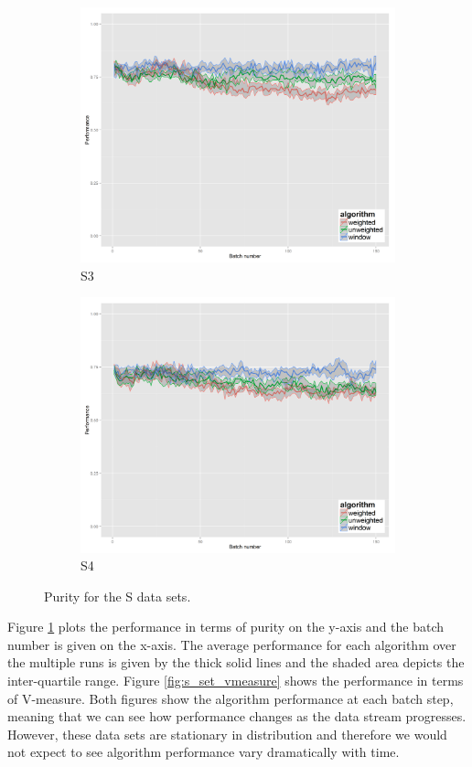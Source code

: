 \begin{figure}[H]
\begin{subfigure}{.45\textwidth}
  \includegraphics[width=.9\linewidth]{s_set/s_set_3_ci_one_size_purity.png}
  \caption{S3}
\end{subfigure}%
\begin{subfigure}{.45\textwidth}
  \centering
  \includegraphics[width=.9\linewidth]{s_set/s_set_4_ci_one_size_purity.png}
  \caption{S4}
\end{subfigure}
\caption{Purity for the S data sets.}
\label{fig:s_set_purity}
\end{figure}

Figure \ref{fig:s_set_purity} plots the performance in terms of purity on the y-axis and the batch number is given on the x-axis. The average performance for each algorithm over the multiple runs is given by the thick solid lines and the shaded area depicts the inter-quartile range.  Figure \ref{fig:s_set_vmeasure} shows the performance in terms of V-measure.  Both figures show the algorithm performance at each batch step, meaning that we can see how performance changes as the data stream progresses. However, these data sets are stationary in distribution and therefore we would not expect to see algorithm performance vary dramatically with time. 

